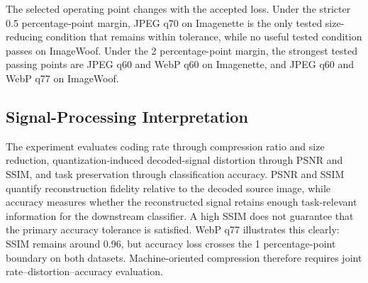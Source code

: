 The selected operating point changes with the accepted loss. Under the stricter 0.5 percentage-point margin, JPEG q70 on Imagenette is the only tested size-reducing condition that remains within tolerance, while no useful tested condition passes on ImageWoof. Under the 2 percentage-point margin, the strongest tested passing points are JPEG q60 and WebP q60 on Imagenette, and JPEG q60 and WebP q77 on ImageWoof.

\subsection{Signal-Processing Interpretation}

The experiment evaluates coding rate through compression ratio and size reduction, quantization-induced decoded-signal distortion through PSNR and SSIM, and task preservation through classification accuracy. PSNR and SSIM quantify reconstruction fidelity relative to the decoded source image, while accuracy measures whether the reconstructed signal retains enough task-relevant information for the downstream classifier. A high SSIM does not guarantee that the primary accuracy tolerance is satisfied. WebP q77 illustrates this clearly: SSIM remains around 0.96, but accuracy loss crosses the 1 percentage-point boundary on both datasets. Machine-oriented compression therefore requires joint rate--distortion--accuracy evaluation.
